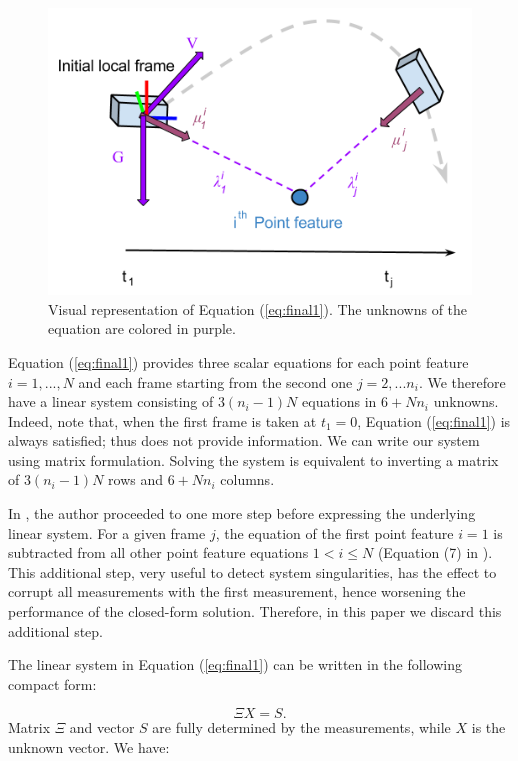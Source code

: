 \documentclass[letterpaper, 10 pt, journal, twoside]{IEEEtran}  %
\begin{document}
\begin{figure}
  \centering
  \includegraphics[width=0.9\columnwidth, trim={0 2cm 0 0}, clip]{images/closedFormExplained}
  \caption{Visual representation of Equation (\ref{eq:final1}).
  The unknowns of the equation are colored in \textcolor{amethyst}{purple}.}
\end{figure}

Equation (\ref{eq:final1}) provides three scalar equations for each point feature $i=1,...,N$ and each frame starting from the second one $j=2,...n_i$.
We therefore have a linear system consisting of $3(n_i-1)N$ equations in $6 + Nn_i$ unknowns.
Indeed, note that, when the first frame is taken at $t_1 = 0$,
Equation (\ref{eq:final1}) is always satisfied; thus does not provide information.
We can write our system using matrix formulation.
Solving the system is equivalent to inverting a matrix of $3(n_i-1)N$ rows and $6+Nn_i$ columns.

In \cite{Martinelli2014}, the author proceeded to one more step before expressing the underlying linear system.
For a given frame $j$, the equation of the first point feature $i=1$ is subtracted from all other point feature equations $1<i \leq N$ (Equation (7) in \cite{Martinelli2014}).
This additional step, very useful to detect system singularities, has the effect to corrupt all measurements with the first measurement,
hence worsening the performance of the closed-form solution. Therefore,
in this paper we discard this additional step.

The linear system in Equation (\ref{eq:final1}) can be written in the following compact form:

\begin{equation}
\label{eq:mat1}
\Xi X = S.
\end{equation}
\noindent Matrix $\Xi$ and vector $S$ are fully determined by the measurements, while $X$ is the unknown vector.
We have:
\end{document}
